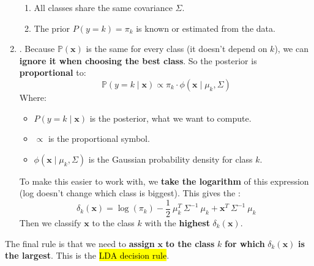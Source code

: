 \begin{enumerate}
\begin{enumerate}
        \item All classes share the same covariance $\Sigma$.

        \item The prior $P\left(y = k\right) = \pi_{k}$ is known or estimated from the data.
    \end{enumerate}


    \item {}. Because $\mathbb{P}\left(\mathbf{x}\right)$ is the same for every class (it doesn't depend on $k$), we can \textbf{ignore it when choosing the best class}. So the posterior is \textbf{proportional} to:
    \begin{equation*}
        \mathbb{P}\left(y = k \mid \mathbf{x}\right) \propto \pi_k \cdot \phi\left(\mathbf{x} \mid \mu_k, \Sigma\right)
    \end{equation*}
    Where:
    \begin{itemize}
        \item $P\left(y = k \mid \mathbf{x}\right)$ is the posterior, what we want to compute.
        \item $\propto$ is the proportional symbol.
        \item $\phi(\mathbf{x} \mid \mu_k, \Sigma)$ is the Gaussian probability density for class $k$.
    \end{itemize}
    To make this easier to work with, we \textbf{take the logarithm} of this expression (log doesn't change which class is biggest). This gives the :
    \begin{equation}\label{eq: discriminant function - lda}
        \delta_{k}\left(\mathbf{x}\right) = \log\left(\pi_{k}\right) - \frac{1}{2} \: \mu_{k}^{T} \: \Sigma^{-1} \: \mu_{k} + \mathbf{x}^{T} \: \Sigma^{-1} \: \mu_{k}
    \end{equation}
    Then we classify $\mathbf{x}$ to the class $k$ with the \textbf{highest} $\delta_{k}\left(\mathbf{x}\right)$.
\end{enumerate}
The final rule is that we need to \textbf{assign} $\mathbf{x}$ \textbf{to the class} $k$ \textbf{for which} $\delta_{k}\left(\mathbf{x}\right)$ \textbf{is the largest}. This is the \hl{LDA decision rule}.

